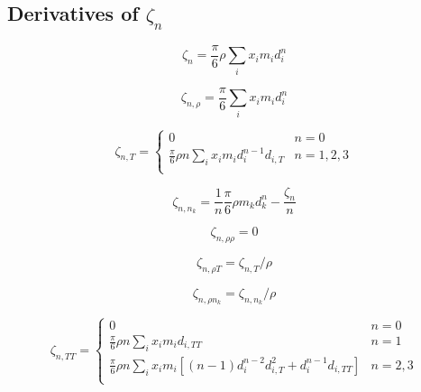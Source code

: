 \documentclass[internal,english]{sintefmemo2012}
\newcommand*{\pdder}[2]{\left(\frac{\partial^2 #1}{\partial #2^2}\right)}
\newcommand{\z}{\zeta}
\begin{document}

\subsection{Derivatives of $\z_n$}
\begin{equation}
  \z_{n} = \frac{\pi}{6} \rho \sum_i x_i m_i d_i^n
\end{equation}

\begin{equation}
  \z_{n,\rho} = \frac{\pi}{6} \sum_i x_i m_i d_i^n
\end{equation}

\begin{equation}
  \z_{n,T} = \begin{cases}
    0 & n = 0 \\ 
    \frac{\pi}{6} \rho n \sum_i x_i m_i d_i^{n-1} d_{i,T} & n = 1,2,3 \\
  \end{cases}
\end{equation}

\begin{equation}
  \z_{n,n_k} = \frac{1}{n} \frac{\pi}{6} \rho m_k d_k^n - \frac{\z_n}{n}
\end{equation}

\begin{equation}
  \z_{n,\rho\rho} = 0
\end{equation}

\begin{equation}
  \z_{n,\rho T} = \z_{n,T}/\rho
\end{equation}

\begin{equation}
  \z_{n,\rho n_k} = \z_{n,n_k}/\rho
\end{equation}

\begin{equation}
  \z_{n,TT} = \begin{cases}
    0 & n = 0 \\
    \frac{\pi}{6} \rho n \sum_i x_i m_i d_{i,TT} & n = 1 \\
    \frac{\pi}{6} \rho n \sum_i x_i m_i \left[ (n-1) d_i^{n-2} d_{i,T}^2 + d_i^{n-1} d_{i,TT} \right] & n = 2,3 \\
  \end{cases}
\end{equation}
\end{document}

